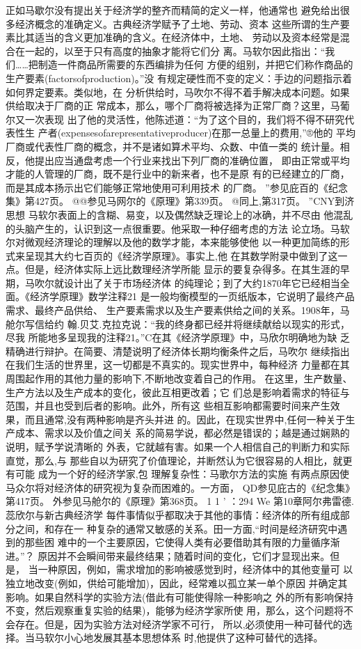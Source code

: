 正如马歇尔没有提出关于经济学的整齐而精简的定义一样，他通常也
避免给出很多经济概念的准确定义。古典经济学赋予了土地、劳动、资本
这些所谓的生产要素比其适当的含义更加准确的含义。在经济体中，土地、
劳动以及资本经常是混合在一起的，以至于只有高度的抽象才能将它们分
离。马软尔因此指出：“我们……把制造一件商品所需要的东西编排为任何
方便的组别，并把它们称作商品的生产要素(factorsofproduction)。”没
有规定硬性而不变的定义：手边的问题指示着如何界定要素。类似地，在
分析供给时，马吹尔不得不着手解决成本问题。如果供给取决于厂商的正
常成本，那么，哪个厂商将被选择为正常厂商？这里，马葡尔又一次表现
出了他的灵活性，他陈述道：“为了这个目的，我们将不得不研究代表性生
产者(expensesofarepresentativeproducer)在那一总量上的费用,”®他的
平均厂商或代表性厂商的概念，并不是诸如算术平均、众数、中值一类的
统计量。相反，他提出应当通盘考虑一个行业来找出下列厂商的准确位置，
即由正常或平均才能的人管理的厂商，既不是行业中的新来者，也不是原
有的已经建立的厂商，而是其成本扬示出它们能够正常地使用可利用技术
的厂商。
”参见庇百的《纪念集》第427页。
@@参见马网尔的《原理》第339页。
@同上,第317页。
”CNY到济思想
马软尔表面上的含糊、易变，以及偶然缺乏理论上的冰确，并不尽由
他混乱的头脑产生的，认识到这一点很重要。他采取一种仔细考虑的方法
论立场。马软尔对微观经济理论的理解以及他的数学才能，本来能够使他
以一种更加简练的形式来呈现其大约七百页的《经济学原理》。事实上,他
在其数学附录中做到了这一点。但是，经济体实际上远比数理经济学所能
显示的要复杂得多。在其生涯的早期，马吹尔就设计出了关于市场经济体
的纯理论；到了大约1870年它已经相当全面。《经济学原理》数学注释21
是一般均衡模型的一页纸版本，它说明了最终产品需求、最终产品供给、
生产要素需求以及生产要素供给之间的关系。1908年，马舱尔写信给约
翰.贝艾.克拉克说：“我的终身都已经并将继续献给以现实的形式，尽我
所能地多呈现我的注释21。”C在其《经济学原理》中，马欣尔明确地为缺
乏精确进行辩护。在简要、清楚说明了经济体长期均衡条件之后，马吹尔
继续指出
在我们生活的世界里，这一切都是不真实的。现实世界中，每种经济
力量都在其周围起作用的其他力量的影响下,不断地改变着自己的作用。
在这里，生产数量、生产方法以及生产成本的变化，彼此互相更改着；它
们总是影响着需求的特征与范围，并且也受到后者的影响。此外，所有这
些相互影响都需要时间来产生效果，而且通常,没有两种影响是齐头并进
的。因此，在现实世界中,任何一种关于生产成本、需求以及价值之间关
系的简易学说，都必然是错误的；越是通过娴熟的说明，赋予学说清晰的
外表，它就越有害。如果一个人相信自己的判断力和实际直觉，那么,与
那些自以为研究了价值理论，并断然认为它很容易的人相比，就更有可能
成为一个好的经济学家,包
理解复杂性：马歌尔方法的实施
有两点原因使马众尔将对经济体的研究视为复杂而困难的。一方面，
QD参见庇古的《纪念集》第417页。
外参见马舱尔的《原理》第368页。
1
1
'
：294
We
第10章阿尔弗雷德.蕊欣尔与新古典经济学
每件事情似乎都取决于其他的事情：经济体的所有组成部分之间，和存在一
种复杂的通常又敏感的关系。田一方面,“时间是经济研究中遇到的那些困
难中的一个主要原因，它使得人类有必要借助其有限的力量循序渐进。”？
原因并不会瞬间带来最终结果；随着时间的变化，它们才显现出来。但是，
当一种原因，例如，需求增加的影响被感觉到时，经济体中的其他变量可
以独立地改变(例如，供给可能增加)，因此，经常难以孤立某一单个原因
并确定其影响。如果自然科学的实验方法(借此有可能使得除一种影响之
外的所有影响保持不变，然后观察重复实验的结果)，能够为经济学家所使
用，那么，这个问题将不会存在。但是，因为实验方法对经济学家不可行，
所以,必须使用一种可替代的选择。当马软尔小心地发展其基本思想体系
时,他提供了这种可替代的选择。

